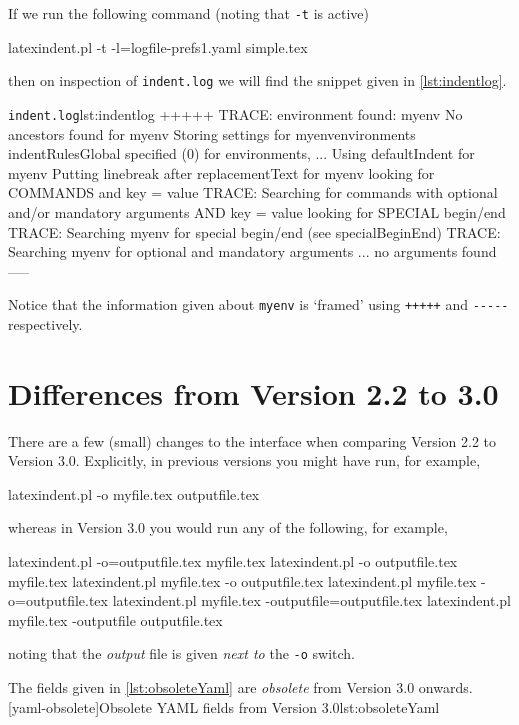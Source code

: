 	 If we run the following command (noting that \texttt{-t} is active)
	 \begin{commandshell}
latexindent.pl -t -l=logfile-prefs1.yaml simple.tex 
 \end{commandshell}
	 then on inspection of \texttt{indent.log} we will find the snippet given in
	 \cref{lst:indentlog}.
	 \begin{cmhlistings}[style=tcblatex,morekeywords={TRACE}]{\texttt{indent.log}}{lst:indentlog}
       +++++
TRACE: environment found: myenv
       No ancestors found for myenv
       Storing settings for myenvenvironments
       indentRulesGlobal specified (0) for environments, ...
       Using defaultIndent for myenv
       Putting linebreak after replacementText for myenv
       looking for COMMANDS and key = {value}
TRACE: Searching for commands with optional and/or mandatory arguments AND key = {value}
       looking for SPECIAL begin/end
TRACE: Searching myenv for special begin/end (see specialBeginEnd)
TRACE: Searching myenv for optional and mandatory arguments
       ... no arguments found
       -----
     \end{cmhlistings}
	 Notice that the information given about \texttt{myenv} is `framed' using
	 \texttt{+++++} and \lstinline!-----! respectively.

	\section{Differences from Version 2.2 to 3.0}\label{app:differences}
	 There are a few (small) changes to the interface when comparing Version 2.2 to Version
	 3.0. Explicitly, in previous versions you might have run, for example,
	 \begin{commandshell}
latexindent.pl -o myfile.tex outputfile.tex
 \end{commandshell}
	 whereas in Version 3.0 you would run any of the following, for example,
	 \begin{commandshell}
latexindent.pl -o=outputfile.tex myfile.tex
latexindent.pl -o outputfile.tex myfile.tex
latexindent.pl myfile.tex -o outputfile.tex 
latexindent.pl myfile.tex -o=outputfile.tex 
latexindent.pl myfile.tex -outputfile=outputfile.tex 
latexindent.pl myfile.tex -outputfile outputfile.tex 
 \end{commandshell}
	 noting that the \emph{output} file is given \emph{next to} the
	 \texttt{-o} switch.

	 The fields given in \cref{lst:obsoleteYaml} are \emph{obsolete} from Version 3.0
	 onwards. [yaml-obsolete]{Obsolete YAML fields from Version 3.0}{lst:obsoleteYaml}

